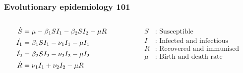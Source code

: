 \documentclass{beamer}
\begin{document}
\begin{frame}
  \frametitle{Evolutionary epidemiology 101}
  

  \begin{columns}
    \begin{column}{0.6 \linewidth}
      \begin{footnotesize}
        \begin{align}
          \dot{S} &= \mu -\beta_1SI_1 -\beta_2SI_2 -\mu R \notag\\
          \dot{I_1} &= \beta_1SI_1 -\nu_1 I_1 -\mu I_1 \notag \\
          \dot{I_2} &= \beta_2SI_2 -\nu_2 I_2 -\mu I_2 \notag \\
          \dot{R} &= \nu_1 I_1 +\nu_2 I_2 -\mu R \notag
        \end{align}
      \end{footnotesize}      
    \end{column}
    \begin{column}{0.4 \linewidth}
      \begin{footnotesize}
        \begin{align*}
          S &\text{: Susceptible} \\
          I &\text{: Infected and infectious} \\
          R &\text{: Recovered and immunised} \\
          \mu &\text{: Birth and death rate} 
        \end{align*}
      \end{footnotesize} 
    \end{column}
  \end{columns}



\end{frame}
\end{document}
